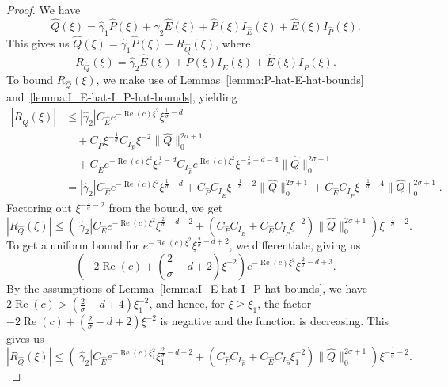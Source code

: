 \documentclass[11pt]{article}
\DeclareMathOperator{\real}{Re}
\begin{document}
\begin{proof}
  We have
  \begin{equation*}
    \hat{Q}(\xi) = \hat{\gamma}_{1}\hat{P}(\xi) + \hat{\gamma}_{2}\hat{E}(\xi)
    + \hat{P}(\xi)I_{\hat{E}}(\xi) + \hat{E}(\xi)I_{\hat{P}}(\xi).
  \end{equation*}
  This gives us
  \(\hat{Q}(\xi) = \hat{\gamma}_{1}\hat{P}(\xi) + R_{\hat{Q}}(\xi)\),
  where
  \begin{equation*}
    R_{\hat{Q}}(\xi) = \hat{\gamma}_{2}\hat{E}(\xi) + \hat{P}(\xi)I_{\hat{E}}(\xi) + \hat{E}(\xi)I_{\hat{P}}(\xi).
  \end{equation*}
  To bound \(R_{\hat{Q}}(\xi)\), we make use of
  Lemmas~\ref{lemma:P-hat-E-hat-bounds}
  and~\ref{lemma:I_E-hat-I_P-hat-bounds}, yielding
  \begin{equation*}
    \begin{split}
      |R_{\hat{Q}}(\xi)|
      &\leq |\hat{\gamma}_{2}|C_{\hat{E}}e^{-\real(c)\xi^{2}}\xi^{\frac{1}{\sigma} - d}\\
      &\quad+ C_{\hat{P}}\xi^{-\frac{1}{\sigma}}C_{I_{\hat{E}}}\xi^{-2}\|\hat{Q}\|_{0}^{2\sigma + 1}\\
      &\quad+ C_{\hat{E}}e^{-\real(c)\xi^{2}}\xi^{\frac{1}{\sigma} - d}C_{I_{\hat{P}}}e^{\real(c)\xi^{2}}\xi^{-\frac{2}{\sigma} + d - 4}\|\hat{Q}\|_{0}^{2\sigma + 1}\\
      &= |\hat{\gamma}_{2}|C_{\hat{E}}e^{-\real(c)\xi^{2}}\xi^{\frac{1}{\sigma} - d}
      + C_{\hat{P}}C_{I_{\hat{E}}}\xi^{-\frac{1}{\sigma} - 2}\|\hat{Q}\|_{0}^{2\sigma + 1}
      + C_{\hat{E}}C_{I_{\hat{P}}}\xi^{-\frac{1}{\sigma} - 4}\|\hat{Q}\|_{0}^{2\sigma + 1}.
    \end{split}
  \end{equation*}
  Factoring out \(\xi^{-\frac{1}{\sigma} - 2}\) from the bound, we get
  \begin{equation*}
    |R_{\hat{Q}}(\xi)|
    \leq \left(|\hat{\gamma}_{2}|C_{\hat{E}}e^{-\real(c)\xi^{2}}\xi^{\frac{2}{\sigma} - d + 2}
      + (C_{\hat{P}}C_{I_{\hat{E}}} + C_{\hat{E}}C_{I_{\hat{P}}}\xi^{-2})\|\hat{Q}\|_{0}^{2\sigma + 1}
    \right)\xi^{-\frac{1}{\sigma} - 2}.
  \end{equation*}
  To get a uniform bound for
  \(e^{-\real(c)\xi^{2}}\xi^{\frac{2}{\sigma} - d + 2}\), we
  differentiate, giving us
  \begin{equation*}
    \left(-2\real(c) + \left(\frac{2}{\sigma} - d + 2\right)\xi^{-2}\right)
    e^{-\real(c)\xi^{2}}\xi^{\frac{2}{\sigma} - d + 3}.
  \end{equation*}
  By the assumptions of Lemma~\ref{lemma:I_E-hat-I_P-hat-bounds}, we
  have
  \(2\real(c) > \left(\frac{2}{\sigma} - d + 4\right)\xi_{1}^{-2}\),
  and hence, for \(\xi \geq \xi_{1}\), the factor
  \(-2\real(c) + \left(\frac{2}{\sigma} - d + 2\right)\xi^{-2}\) is
  negative and the function is decreasing. This gives us
  \begin{equation*}
    |R_{\hat{Q}}(\xi)|
    \leq \left(|\hat{\gamma}_{2}|C_{\hat{E}}e^{-\real(c)\xi_{1}^{2}}\xi_{1}^{\frac{2}{\sigma} - d + 2}
      + (C_{\hat{P}}C_{I_{\hat{E}}} + C_{\hat{E}}C_{I_{\hat{P}}}\xi_{1}^{-2})\|\hat{Q}\|_{0}^{2\sigma + 1}
    \right)\xi^{-\frac{1}{\sigma} - 2}.
  \end{equation*}


\end{proof}
\end{document}
